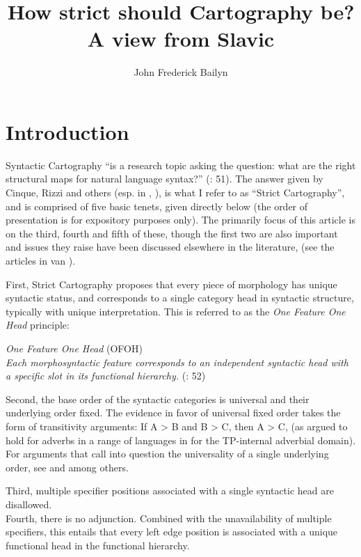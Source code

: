 \documentclass[output=paper,colorlinks,citecolor=brown,
]{langscibook}
\author{John Frederick Bailyn\affiliation{Stony Brook University}\orcid{}}
\title{How strict should Cartography be? A view from Slavic}
\begin{document}
\maketitle

\section{Introduction}
Syntactic Cartography “is a research topic asking the question: what are the right structural maps for natural language syntax?” (\citealt{CinqueRizzi2010}: 51). The answer given by Cinque, Rizzi and others (esp. in \citealt{cinque1999}, \citealt{CinqueRizzi2010, rizzicinque2016}), is what I refer to as “Strict Cartography”, and is comprised of five basic tenets, given directly below (the order of presentation is for expository purposes only). The primarily focus of this article is on the third, fourth and fifth of these, though the first two are also important and issues they raise have been discussed elsewhere in the literature, (see the articles in van \citealt{Craenenbroeck2009}). 

First, Strict Cartography proposes that every piece of morphology has unique syntactic status, and corresponds to a single category head in syntactic structure, typically with unique interpretation. This is referred to as the \textit{One Feature One Head} principle: 


\begin{exe}
\ex \label{bai1}
\emph{One Feature One Head} (OFOH) \\
\emph{Each morphosyntactic feature corresponds to an independent  syntactic head with a specific slot in its functional hierarchy.} (\citealt{CinqueRizzi2010}: 52)
\end{exe}

Second, the base order of the syntactic categories is universal and their underlying order fixed. The evidence in favor of universal fixed order takes the form of transitivity arguments: If A > B and B > C, then A > C, (as argued to hold for adverbs in a range of languages in \citealt{cinque1999} for the TP-internal adverbial domain). For arguments that call into question the universality of a single underlying order, see \citealt{Bobaljik1999} and \citealt{Nilsen2003} among others. 

Third, multiple specifier positions associated with a single syntactic head are disallowed. \\ 

Fourth, there is no adjunction. Combined with the unavailability of multiple specifiers, this entails that every left edge position is associated with a unique functional head in the functional hierarchy. 
\end{document}
